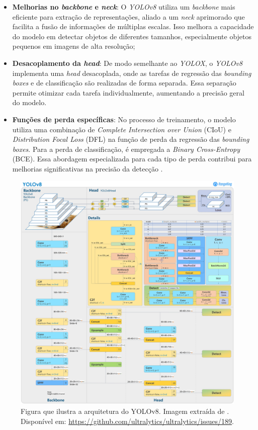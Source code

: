 \begin{itemize} 
    \item \textbf{Melhorias no \emph{backbone} e \emph{neck}}: O \emph{YOLOv8} utiliza um \emph{backbone} mais eficiente para extração de representações, aliado a um \emph{neck} aprimorado que facilita a fusão de informações de múltiplas escalas. Isso melhora a capacidade do modelo em detectar objetos de diferentes tamanhos, especialmente objetos pequenos em imagens de alta resolução;

    \item \textbf{Desacoplamento da \emph{head}}: De modo semelhante ao \emph{YOLOX}, o \emph{YOLOv8} implementa uma \emph{head} desacoplada, onde as tarefas de regressão das \emph{bounding boxes} e de classificação são realizadas de forma separada. Essa separação permite otimizar cada tarefa individualmente, aumentando a precisão geral do modelo.

    \item \textbf{Funções de perda específicas}: No processo de treinamento, o modelo utiliza uma combinação de \emph{Complete Intersection over Union} (CIoU) \citep{Zheng2020} e \emph{Distribution Focal Loss} (DFL) \citep{Li2020} na função de perda da regressão das \emph{bounding boxes}. Para a perda de classificação, é empregada a \emph{Binary Cross-Entropy} (BCE). Essa abordagem especializada para cada tipo de perda contribui para melhorias significativas na precisão da detecção \citep{yolo_review}.
\end{itemize}
\begin{figure}[htb!]
    \centering
    \includegraphics[width=0.8\linewidth]{images/yolov8.jpg}
    \caption{\label{fig:yolov8_issue189} Figura que ilustra a arquitetura do YOLOv8. Imagem extraída de \citeauthor{ultralytics_issue_189}. Disponível em: \url{https://github.com/ultralytics/ultralytics/issues/189}.}
\end{figure}

